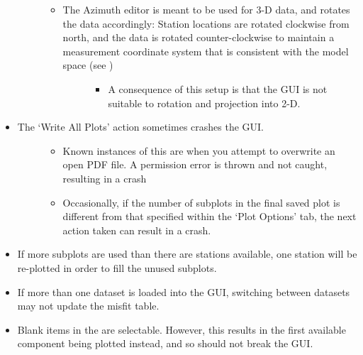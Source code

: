 \documentclass[letterpaper,10pt,english]{sphinxmanual}
\begin{document}
\begin{itemize}
\begin{description}
\begin{itemize}
\item {} \begin{description}
\item[{The Azimuth editor is meant to be used for 3-D data, and rotates the data accordingly: Station locations are rotated clockwise from north, and the data is rotated counter-clockwise to maintain a measurement coordinate system that is consistent with the model space (see )}] \leavevmode\begin{itemize}
\item {} 
A consequence of this setup is that the GUI is not suitable to rotation and projection into 2-D.

\end{itemize}

\end{description}

\end{itemize}

\end{description}

\item {} \begin{description}
\item[{The ‘Write All Plots’ action sometimes crashes the GUI.}] \leavevmode\begin{itemize}
\item {} 
Known instances of this are when you attempt to overwrite an open PDF file. A permission error is thrown and not caught, resulting in a crash

\item {} 
Occasionally, if the number of subplots in the final saved plot is different from that specified within the ‘Plot Options’ tab, the next action taken can result in a crash.

\end{itemize}

\end{description}

\item {} 
If more subplots are used than there are stations available, one station will be re-plotted in order to fill the unused subplots.

\item {} 
If more than one dataset is loaded into the GUI, switching between datasets may not update the misfit table.

\item {} 
Blank items in the {\hyperref[\detokenize{content/data_plot/main_window:data-component-table}]{}} are selectable. However, this results in the first available component being plotted instead, and so should not break the GUI.


\end{itemize}
\end{document}

